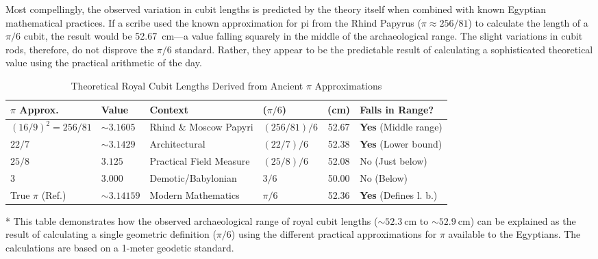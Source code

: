 \documentclass[11pt]{article}
\begin{document}
Most compellingly, the observed variation in cubit lengths is predicted by the theory itself when combined with known Egyptian mathematical practices. If a scribe used the known approximation for pi from the Rhind Papyrus ($\pi \approx 256/81$) to calculate the length of a $\pi/6$ cubit, the result would be \SI{52.67}{\centi\meter}---a value falling squarely in the middle of the archaeological range. The slight variations in cubit rods, therefore, do not disprove the $\pi/6$ standard. Rather, they appear to be the predictable result of calculating a sophisticated theoretical value using the practical arithmetic of the day.

\begin{table}[h!]
\centering
\begin{threeparttable}
    \caption{Theoretical Royal Cubit Lengths Derived from Ancient $\pi$ Approximations}
    \label{tbl:pi_approximations}
    \begin{tabular}{l l l l S[table-format=2.2] l}
        \toprule
        \textbf{$\pi$ Approx.} & \textbf{Value} & \textbf{Context} & \textbf{($\pi/6$)} & {\textbf{(cm)}} & \textbf{Falls in Range?} \\
        \midrule
        $(16/9)^2 = 256/81$ & $\sim3.1605$  & Rhind \& Moscow Papyri & $(256/81) / 6$ & 52.67 & \textbf{Yes} (Middle range) \\
        \addlinespace
        $22/7$              & $\sim3.1429$  & Architectural          & $(22/7) / 6$   & 52.38 & \textbf{Yes} (Lower bound) \\
        \addlinespace
        $25/8$              & $3.125$       & Practical Field Measure  & $(25/8) / 6$   & 52.08 & No (Just below) \\
        \addlinespace
        $3$                 & $3.000$       & Demotic/Babylonian       & $3 / 6$        & 50.00 & No (Below) \\
        \midrule %
        True $\pi$ (Ref.) & $\sim3.14159$ & Modern Mathematics     & $\pi / 6$      & 52.36 & \textbf{Yes} (Defines l. b.) \\
        \bottomrule
    \end{tabular}
    \begin{tablenotes}[flushleft] %
      \small %
      \item[*] This table demonstrates how the observed archaeological range of royal cubit lengths ($\sim\SI{52.3}{\centi\meter}$ to $\sim\SI{52.9}{\centi\meter}$) can be explained as the result of calculating a single geometric definition ($\pi/6$) using the different practical approximations for $\pi$ available to the Egyptians. The calculations are based on a 1-meter geodetic standard.
    \end{tablenotes}
\end{threeparttable}
\end{table}
\end{document}
